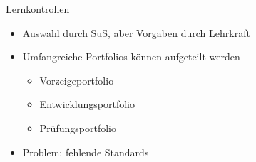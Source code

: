\documentclass{article}
\begin{document}
\begin{block}{Lernkontrollen}
\begin{itemize}
\begin{itemize}
            \item Auswahl durch SuS, aber Vorgaben durch Lehrkraft
            \item Umfangreiche Portfolios können aufgeteilt werden
            \begin{itemize}
                \item Vorzeigeportfolio
                \item Entwicklungsportfolio
                \item Prüfungsportfolio
            \end{itemize}
            \item Problem: fehlende Standards
        \end{itemize}
    \end{itemize}
\end{block}
\end{document}
